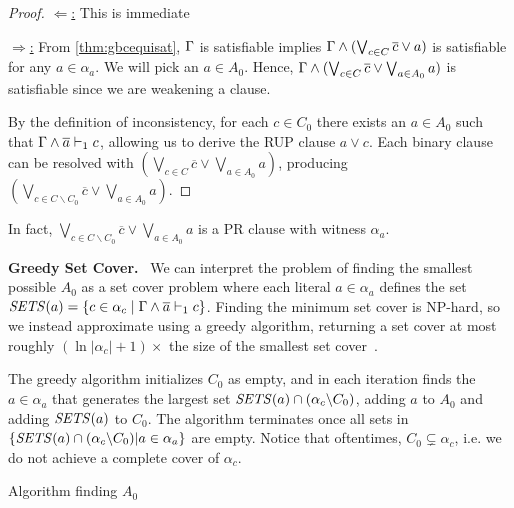 \begin{proof}
    \underline{$\Leftarrow$:} This is immediate


    \underline{$\Rightarrow$:} From \autoref{thm:gbcequisat}, $\Gamma$ is
    satisfiable implies $\Gamma \land (\bigvee_{c \in C} \overline{c} \lor a)$
    is satisfiable for any $a \in \alpha_a$. We will pick an $a \in A_0$. Hence,
    $\Gamma \land (\bigvee_{c \in C} \overline{c} \lor \bigvee_{a \in A_0} a)$
    is satisfiable since we are weakening a clause.

    By the definition of inconsistency, for each $c \in C_0$ there exists an $a
    \in A_0$ such that $\Gamma \land \overline{a} \vdash_1 c$, allowing us to derive
    the RUP clause  $a \lor c$. Each binary clause can be resolved with $
    (\bigvee_{c \in C} \overline{c} \lor \bigvee_{a \in A_0} a)$, producing
    $(\bigvee_{c \in C \backslash C_0} \overline{c} \lor \bigvee_{a \in A_0}
    a)$. 
    
\end{proof}

In fact, $\bigvee_{c \in C \backslash C_0} \overline{c} \lor \bigvee_{a \in A_0}
a$ is a PR clause with witness $\alpha_a$. 


\noindent \textbf{Greedy Set Cover.}~\label{subsec:sym}
We can interpret the problem of finding the smallest possible $A_0$ as a set
cover problem where each literal $a \in \alpha_a$ defines the set  ${\it
SETS}(a) = \{ c \in \alpha_c \; | \; \Gamma \land \overline{a} \vdash_1 c\}$. Finding
the minimum set cover is NP-hard, so we instead approximate using a greedy
algorithm, returning a set cover at most roughly $(\ln |\alpha_c| + 1)\times$
the size of the smallest set cover~\cite{greedysetcover}. 


The greedy algorithm initializes $C_0$ as empty, and in each iteration finds the
$a \in \alpha_a$ that generates the largest set ${\it SETS}(a) \cap (\alpha_c
\backslash C_0)$, adding $a$ to $A_0$ and adding ${\it SETS}(a)$ to $C_0$. The
algorithm terminates once all sets in $\{{\it SETS}(a) \cap (\alpha_c \backslash
C_0) | a \in \alpha_a \}$ are empty. Notice that oftentimes, $C_0 \subsetneq \alpha_c$,
i.e. we do not achieve a complete cover of $\alpha_c$.


\begin{algorithm}
    \caption{Algorithm finding $A_0$}\label{alg:finda0} \SetAlgoNoLine
     
      
\end{algorithm}


